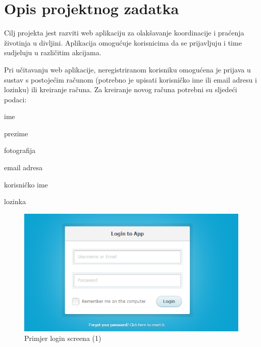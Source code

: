 \chapter{Opis projektnog zadatka}
		
		Cilj projekta jest razviti web aplikaciju za olakšavanje koordinacije i praćenja životinja u divljini. Aplikacija omogućuje korisnicima da se prijavljuju i time sudjeluju u različitim akcijama.
		
		Pri učitavanju web aplikacije, neregistriranom korisniku omogućena je prijava u sustav s postojećim računom (potrebno je upisati korisničko ime ili email adresu i lozinku) ili kreiranje računa. Za kreiranje novog računa potrebni su sljedeći podaci:
		\begin{packed_item}
			\item ime
			\item prezime
			\item fotografija
			\item email adresa
			\item korisničko ime
			\item lozinka
		\end{packed_item}
		
		\begin{figure}[H]
			\includegraphics[scale=0.5]{slike/login_screen.PNG} %
			\centering
			\caption{Primjer login screena (1)}
			\label{fig:promjene}
		\end{figure}
		
